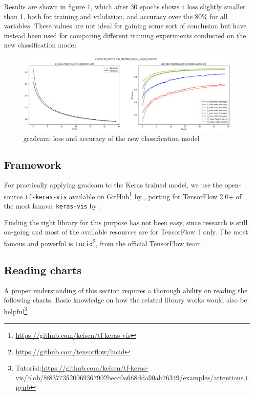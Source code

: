 Results are shown in figure \ref{fig:gradcam-retrain-simple}, which after 30 epochs shows a loss slightly smaller than 1, both for training and validation, and accuracy over the 80\% for all variables. These values are not ideal for gaining some sort of conclusion but have instead been used for comparing different training experiments conducted on the new classification model.

\begin{figure}[!h]
	\centering
	\includegraphics[width=1\textwidth]{"contents/images/04-metrics-class-simple"}
	\caption[\gls{gradcam}: loss and accuracy of the new classification model]{\gls{gradcam}: loss and accuracy of the new classification model}
	\label{fig:gradcam-retrain-simple}
\end{figure}



\subsection{Framework}
\label{subsec:gradcam-framework}

For practically applying \gls{gradcam} to the Keras trained model, we use the open-source \texttt{tf-keras-vis} available on GitHub\footnote{\url{https://github.com/keisen/tf-keras-vis}} by \cite{tf-keras-vis}, porting for TensorFlow 2.0+ of the most famous \texttt{keras-vis} by \cite{keras-vis}.

Finding the right library for this purpose has not been easy, since research is still on-going and most of the available resources are for TensorFlow 1 only. The most famous and powerful is \texttt{Lucid}\footnote{\url{https://github.com/tensorflow/lucid}}, from the official TensorFlow team.


\subsection{Reading charts}
\label{subsec:gradcam-reading}

A proper understanding of this section requires a thorough ability on reading the following charts. Basic knowledge on how the related library works would also be helpful\footnote{Tutorial:\url{https://github.com/keisen/tf-keras-vis/blob/8f83773520069367902becc0a668dda90ab76349/examples/attentions.ipynb}}.

